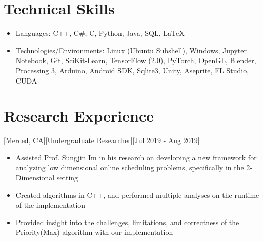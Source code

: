 \documentclass{article}
\begin{document}
\section{Technical Skills}
\begin{itemize}
  \item Languages: C++, C\#, C, Python, Java, SQL, LaTeX
  \item Technologies/Environments: Linux (Ubuntu Subshell), Windows, Jupyter Notebook, Git, SciKit-Learn, TensorFlow (2.0), PyTorch, OpenGL, Blender, Processing 3, Arduino, Android SDK, Sqlite3, Unity, Aseprite, FL Studio, CUDA
\end{itemize}

\section{Research Experience}
[Merced, CA][Undergraduate Researcher][Jul 2019 - Aug 2019]
\begin{itemize}
  \item Assisted Prof. Sungjin Im in his research on developing a new framework for analyzing low dimensional online scheduling problems, specifically in the 2-Dimensional setting
  \item Created algorithms in C++, and performed multiple analyses on the runtime of the implementation
  \item Provided insight into the challenges, limitations, and correctness of the Priority(Max) algorithm with our implementation
\end{itemize}
\end{document}
